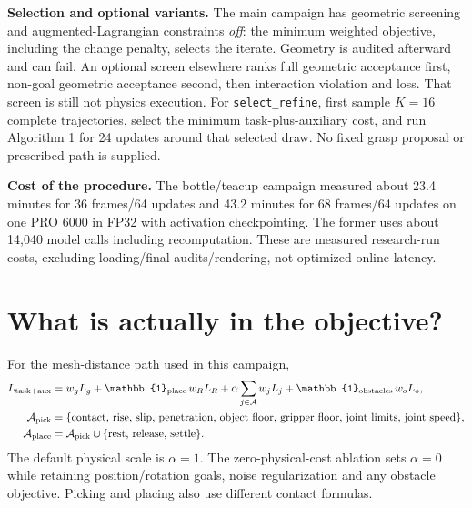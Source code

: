 \documentclass[10pt]{article}
\newcommand{\pathcode}[1]{\nolinkurl{#1}}
\begin{document}
\textbf{Selection and optional variants.} The main campaign has geometric
screening and augmented-Lagrangian constraints \emph{off}: the minimum weighted
objective, including the change penalty, selects the iterate. Geometry is
audited afterward and can fail. An optional screen elsewhere ranks full
geometric acceptance first, non-goal geometric acceptance second, then
interaction violation and loss. That screen is still not physics execution.
For \pathcode{select_refine}, first sample $K=16$ complete trajectories, select
the minimum task-plus-auxiliary cost, and run Algorithm 1 for 24 updates around
that selected draw. No fixed grasp proposal or prescribed path is supplied.

\textbf{Cost of the procedure.} The bottle/teacup campaign measured about
23.4 minutes for 36 frames/64 updates and 43.2 minutes for 68 frames/64 updates
on one PRO 6000 in FP32 with activation checkpointing. The former uses about
14,040 model calls including recomputation. These are measured research-run
costs, excluding loading/final audits/rendering, not optimized online latency.

\clearpage
\section{What is actually in the objective?}
For the mesh-distance path used in this campaign,
\begin{align}
 L_{\rm task+aux}
 &=w_g L_g+\mathbb{1}_{\rm place}\,w_R L_R
       +\alpha\sum_{j\in\mathcal A}w_jL_j
       +\mathbb{1}_{\rm obstacles}\,w_oL_o,\\
 \mathcal A_{\rm pick}
 &=\{\text{contact, rise, slip, penetration, object floor, gripper floor,
                   joint limits, joint speed}\},\nonumber\\
 \mathcal A_{\rm place}
 &=\mathcal A_{\rm pick}\cup\{\text{rest, release, settle}\}.\nonumber
\end{align}
The default physical scale is $\alpha=1$. The zero-physical-cost ablation sets
$\alpha=0$ while retaining position/rotation goals, noise regularization and any
obstacle objective. Picking and placing also use different contact formulas.
\end{document}
